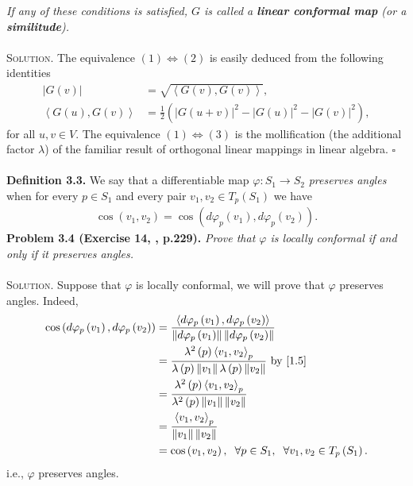 \documentclass[a4paper]{article}
\numberwithin{equation}{section}
\begin{document}
\textit{If any of these conditions is satisfied, $G$ is called a \textbf{linear conformal map} (or a \textbf{similitude}).}\\
\\
\textsc{Solution.} The equivalence $\left( 1 \right) \Leftrightarrow \left( 2 \right)$ is easily deduced from the following identities
\begin{align}
\left| {G\left( v \right)} \right| &= \sqrt {\left\langle {G\left( v \right),G\left( v \right)} \right\rangle } ,\\
\left\langle {G\left( u \right),G\left( v \right)} \right\rangle  &= \frac{1}{2}\left( {{{\left| {G\left( {u + v} \right)} \right|}^2} - {{\left| {G\left( u \right)} \right|}^2} - {{\left| {G\left( v \right)} \right|}^2}} \right),
\end{align}
for all $u,v\in V$. The equivalence $\left( 1 \right) \Leftrightarrow \left( 3 \right)$ is the mollification (the additional factor $\lambda$) of the familiar result of orthogonal linear mappings in linear algebra. \hfill $\square$\\
\\
\textbf{Definition 3.3.} We say that a differentiable map $\varphi :S_1\to S_2$ \textit{preserves angles} when for every $p\in S_1$ and every pair $v_1,v_2\in T_p\left(S_1\right)$ we have
\begin{align}
\cos \left( {{v_1},{v_2}} \right) = \cos \left( {d{\varphi _p}\left( {{v_1}} \right),d{\varphi _p}\left( {{v_2}} \right)} \right).
\end{align}
\textbf{Problem 3.4 (Exercise 14, \cite{2}, p.229).} \textit{Prove that $\varphi$ is locally conformal if and only if it preserves angles.}\\
\\
\textsc{Solution.} Suppose that $\varphi$ is locally conformal, we will prove that $\varphi$ preserves angles. Indeed,
\begin{align}
\cos \left( {d{\varphi _p}\left( {{v_1}} \right),d{\varphi _p}\left( {{v_2}} \right)} \right) &= \frac{{\left\langle {d{\varphi _p}\left( {{v_1}} \right),d{\varphi _p}\left( {{v_2}} \right)} \right\rangle }}{{\left\| {d{\varphi _p}\left( {{v_1}} \right)} \right\|\left\| {d{\varphi _p}\left( {{v_2}} \right)} \right\|}}\\
  &= \frac{{{\lambda ^2}\left( p \right){{\left\langle {{v_1},{v_2}} \right\rangle }_p}}}{{\lambda \left( p \right)\left\| {{v_1}} \right\|\lambda \left( p \right)\left\| {{v_2}} \right\|}} \mbox{ by \eqref{1.5}}\\
&= \frac{{{\lambda ^2}\left( p \right){{\left\langle {{v_1},{v_2}} \right\rangle }_p}}}{{{\lambda ^2}\left( p \right)\left\| {{v_1}} \right\|\left\| {{v_2}} \right\|}}\\
& = \frac{{{{\left\langle {{v_1},{v_2}} \right\rangle }_p}}}{{\left\| {{v_1}} \right\|\left\| {{v_2}} \right\|}}\\
 &= \cos \left( {{v_1},{v_2}} \right),\hspace{0.2cm} \forall p \in {S_1},\hspace{0.2cm}\forall {v_1},{v_2} \in {T_p}\left( {{S_1}} \right).
\end{align}
i.e., $\varphi$ preserves angles.
\end{document}
